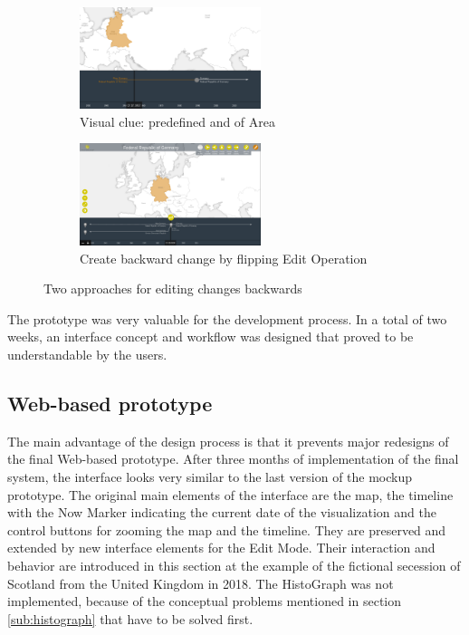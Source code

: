 \begin{figure}[ht]
\centering
\begin{subfigure}[b]{.5\textwidth}
  \centering
  \includegraphics[width=200px]{graphics/development/design_process/backward_change_1.png}
  \caption{Visual clue: predefined and of Area}
  \label{sfig:backward_change_1}
\end{subfigure}%
\begin{subfigure}[b]{.5\textwidth}
  \centering
  \includegraphics[width=200px]{graphics/development/design_process/backward_change_2.png}
  \caption{Create backward change by flipping Edit Operation}
  \label{sfig:backward_change_2}
\end{subfigure}
\caption{Two approaches for editing changes backwards}
\label{fig:backward_change}
\end{figure}

The prototype was very valuable for the development process. In a total of two weeks, an interface concept and workflow was designed that proved to be understandable by the users.



\subsection{Web-based prototype} %
\label{sub:web_based_prototype}

The main advantage of the design process is that it prevents major redesigns of the final Web-based prototype. After three months of implementation of the final system, the interface looks very similar to the last version of the mockup prototype. The original main elements of the interface are the map, the timeline with the Now Marker indicating the current date of the visualization and the control buttons for zooming the map and the timeline. They are preserved and extended by new interface elements for the Edit Mode. Their interaction and behavior are introduced in this section at the example of the fictional secession of Scotland from the United Kingdom in 2018. The HistoGraph was not implemented, because of the conceptual problems mentioned in section \ref{sub:histograph} that have to be solved first.

